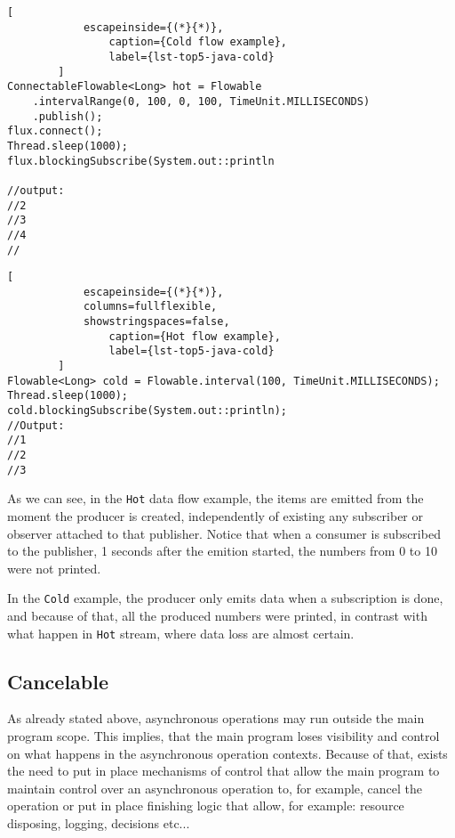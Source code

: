 	\begin{center}
		\lstset{basicstyle=\scriptsize\ttfamily,frame=bottomline}
		\begin{minipage}[t][][b]{.46\textwidth}
		\begin{lstlisting}[
			escapeinside={(*}{*)},
				caption={Cold flow example},
				label={lst-top5-java-cold}
		]
ConnectableFlowable<Long> hot = Flowable
	.intervalRange(0, 100, 0, 100, TimeUnit.MILLISECONDS)
	.publish();
flux.connect(); 
Thread.sleep(1000);
flux.blockingSubscribe(System.out::println

//output:
//2
//3
//4
//
		\end{lstlisting}
		\end{minipage}
		\hfill
		\begin{minipage}{.48\textwidth}
		\lstset{basicstyle=\scriptsize\ttfamily,frame=bottomline}
		\begin{lstlisting}[
			escapeinside={(*}{*)},
			columns=fullflexible,
			showstringspaces=false,
				caption={Hot flow example},
				label={lst-top5-java-cold}
		]
Flowable<Long> cold = Flowable.interval(100, TimeUnit.MILLISECONDS);
Thread.sleep(1000);
cold.blockingSubscribe(System.out::println); 
//Output:
//1
//2
//3
		\end{lstlisting}
		\end{minipage}
	\end{center}


	As we can see, in the \texttt{Hot} data flow example, the items are emitted from the moment the producer is created, independently of existing any subscriber or observer attached to that publisher. Notice that when a consumer is subscribed to the publisher, 1 seconds after the emition started, the numbers from 0 to 10 were not printed.
	
	In the \texttt{Cold} example, the producer only emits data when a subscription is done, and because of that, all the produced numbers were printed, in contrast with what happen in \texttt{Hot} stream, where data loss are almost certain. 
	\clearpage
	\subsection{Cancelable} 
	As already stated above, asynchronous operations may run outside the main program scope. 
	This implies, that the main program loses visibility and control on what happens in the asynchronous operation contexts.
	Because of that, exists the need to put in place mechanisms of control that allow the main program to maintain control over an asynchronous operation to, for example, cancel the operation or put in place finishing logic that allow, for example: resource disposing, logging, decisions etc...

